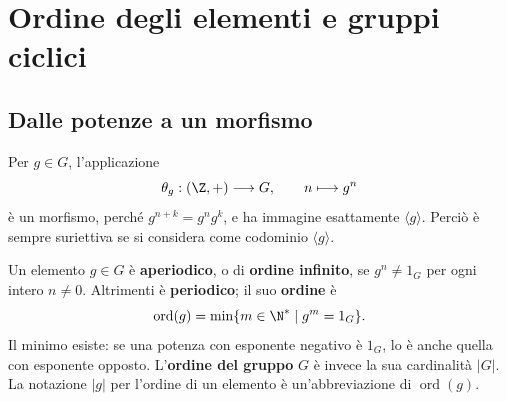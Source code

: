 \section{Ordine degli elementi e gruppi ciclici}
\subsection{Dalle potenze a un morfismo}
Per $g\in G$, l'applicazione
\[
\theta_g:(\Z,+)\longrightarrow G,\qquad n\longmapsto g^n
\]
è un morfismo, perché $g^{n+k}=g^ng^k$, e ha immagine esattamente $\langle g\rangle$. Perciò è sempre suriettiva se si considera come codominio $\langle g\rangle$.

\begin{definizione}
Un elemento $g\in G$ è \textbf{aperiodico}, o di \textbf{ordine infinito}, se $g^n\ne1_G$ per ogni intero $n\ne0$. Altrimenti è \textbf{periodico}; il suo \textbf{ordine} è
\[
\operatorname{ord}(g)=\min\{m\in\N^*\mid g^m=1_G\}.
\]
Il minimo esiste: se una potenza con esponente negativo è $1_G$, lo è anche quella con esponente opposto. L'\textbf{ordine del gruppo} $G$ è invece la sua cardinalità $|G|$. La notazione $|g|$ per l'ordine di un elemento è un'abbreviazione di $\operatorname{ord}(g)$.
\end{definizione}

